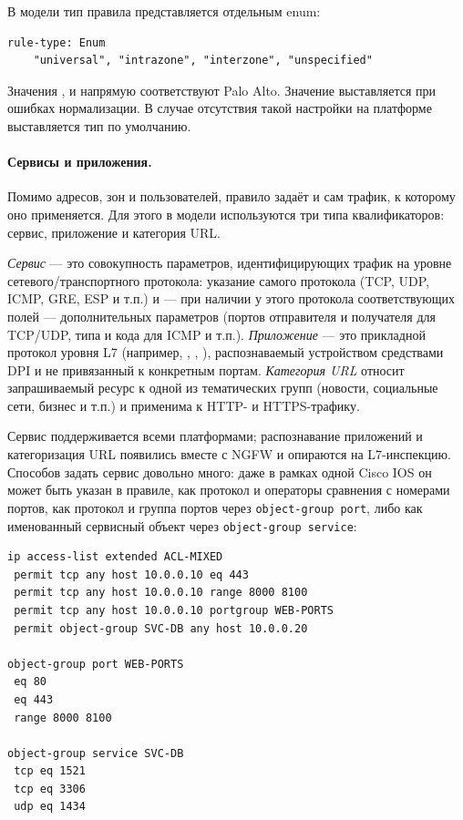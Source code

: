 В модели тип правила представляется отдельным enum:

\begin{lstlisting}[style=schemastyle]
rule-type: Enum
    "universal", "intrazone", "interzone", "unspecified"
\end{lstlisting}

Значения ,  и  напрямую соответствуют  Palo Alto. Значение  выставляется при ошибках нормализации. В случае отсутствия такой настройки на платформе выставляется тип  по умолчанию.

\paragraph{Сервисы и приложения.} Помимо адресов, зон и пользователей, правило задаёт и сам трафик, к которому оно применяется. Для этого в модели используются три типа квалификаторов: сервис, приложение и категория URL.

\emph{Сервис} --- это совокупность параметров, идентифицирующих трафик на уровне сетевого/транспортного протокола: указание самого протокола (TCP, UDP, ICMP, GRE, ESP и т.п.) и --- при наличии у этого протокола соответствующих полей --- дополнительных параметров (портов отправителя и получателя для TCP/UDP, типа и кода для ICMP и т.п.). \emph{Приложение} --- это прикладной протокол уровня L7 (например, , , ), распознаваемый устройством средствами DPI и не привязанный к конкретным портам. \emph{Категория URL} относит запрашиваемый ресурс к одной из тематических групп (новости, социальные сети, бизнес и т.п.) и применима к HTTP- и HTTPS-трафику.

Сервис поддерживается всеми платформами; распознавание приложений и категоризация URL появились вместе с NGFW и опираются на L7-инспекцию. Способов задать сервис довольно много: даже в рамках одной Cisco IOS он может быть указан в правиле, как протокол и операторы сравнения с номерами портов, как протокол и группа портов через \texttt{object-group port}, либо как именованный сервисный объект через \texttt{object-group service}:

\begin{verbatim}
ip access-list extended ACL-MIXED
 permit tcp any host 10.0.0.10 eq 443
 permit tcp any host 10.0.0.10 range 8000 8100
 permit tcp any host 10.0.0.10 portgroup WEB-PORTS
 permit object-group SVC-DB any host 10.0.0.20

object-group port WEB-PORTS
 eq 80
 eq 443
 range 8000 8100

object-group service SVC-DB
 tcp eq 1521
 tcp eq 3306
 udp eq 1434
\end{verbatim}

